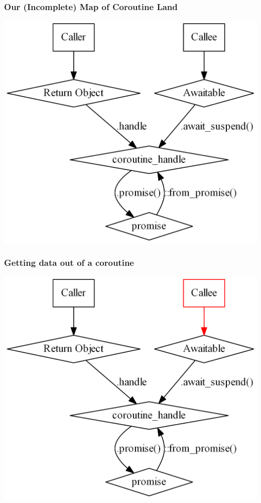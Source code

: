 \documentclass[aspectratio=169]{beamer}
\begin{document}
\begin{frame}[fragile]
  \frametitle{Our (Incomplete) Map of Coroutine Land}
  
  \begin{center}
  \includegraphics[height=.9\textheight]{pipelinesgfx/acquaintances03.png}
  \end{center}
\end{frame}

\begin{frame}[fragile]
  \frametitle{Getting data out of a coroutine}
  \pause
  \begin{center}
  \includegraphics[height=.9\textheight]{pipelinesgfx/path_out_010.png}
  \end{center}
  
\end{frame}
\end{document}
